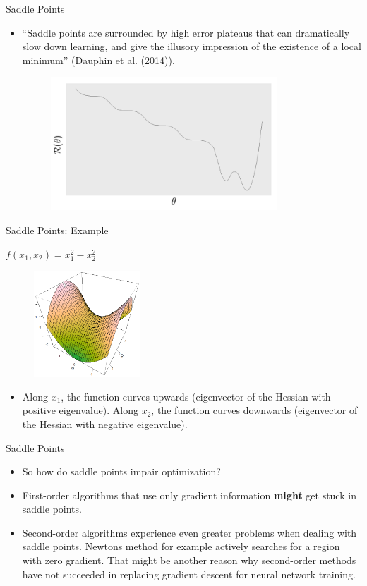 \begin{vbframe}{Saddle Points}
\begin{itemize}
    \item \enquote{Saddle points are surrounded by high error plateaus that can dramatically slow down learning, and give the illusory impression of the existence of a local minimum} (Dauphin et al. (2014)).
  \begin{figure}
    \centering
    \includegraphics[width=8.5cm]{plots/cost.png}
  \end{figure}
  \end{itemize}
\end{vbframe}

\begin{vbframe}{Saddle Points: Example}
  \begin{center}
    $f(x_1, x_2) = x_1^2 - x_2^2$
  \end{center}
  \begin{figure}
    \centering
    \includegraphics[width=4cm]{plots/saddlepoint.png}
  \end{figure} 
  \begin{itemize}
    \item Along $x_1$, the function curves upwards (eigenvector of the Hessian with positive eigenvalue). Along $x_2$, the function curves downwards (eigenvector of the Hessian with negative eigenvalue).
  \end{itemize}
\end{vbframe}

\begin{vbframe}{Saddle Points}
  \begin{itemize}
    \item So how do saddle points impair optimization?
    \item First-order algorithms that use only gradient information \textbf{might} get stuck in saddle points.
    \item Second-order algorithms experience even greater problems when dealing with saddle points. Newtons method for example actively searches for a region with zero gradient. That might be another reason why second-order methods have not succeeded in replacing gradient descent for neural network training. 
  \end{itemize}
\end{vbframe}

